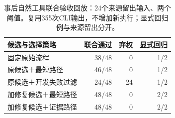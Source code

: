 \begin{table}[t]
\caption{事后自然工具联合验收回放：24个来源留出输入、两个阈值。复用355次CLI输出，不增加新执行；显式回归例与来源留出分开。}\label{tab:natural-joint}
\centering\small
\begin{tabularx}{\textwidth}{Xrrr}
\toprule
候选与选择策略 & 联合通过 & 弃权 & 显式回归 \\
\midrule
固定原始流程 & 38/48 & 0 & 1/2 \\
原候选＋最短路径 & 46/48 & 0 & 1/2 \\
原候选＋开发失败过滤 & 24/48 & 24 & 1/2 \\
加修复候选＋最短路径 & 48/48 & 0 & 2/2 \\
加修复候选＋证据路径 & 48/48 & 0 & 2/2 \\
\bottomrule
\end{tabularx}
\end{table}
